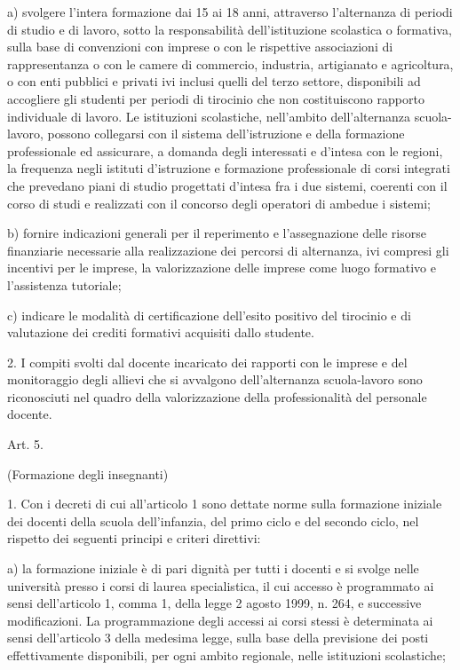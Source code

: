 a) svolgere l'intera formazione dai 15 ai 18 anni, attraverso l'alternanza di periodi di studio e di lavoro, sotto la responsabilità dell'istituzione scolastica o formativa, sulla base di convenzioni con imprese o con le rispettive associazioni di rappresentanza o con le camere di commercio, industria, artigianato e agricoltura, o con enti pubblici e privati ivi inclusi quelli del terzo settore, disponibili ad accogliere gli studenti per periodi di tirocinio che non costituiscono rapporto individuale di lavoro. Le istituzioni scolastiche, nell'ambito dell'alternanza scuola-lavoro, possono collegarsi con il sistema dell'istruzione e della formazione professionale ed assicurare, a domanda degli interessati e d'intesa con le regioni, la frequenza negli istituti d'istruzione e formazione professionale di corsi integrati che prevedano piani di studio progettati d'intesa fra i due sistemi, coerenti con il corso di studi e realizzati con il concorso degli operatori di ambedue i sistemi;

b) fornire indicazioni generali per il reperimento e l'assegnazione delle risorse finanziarie necessarie alla realizzazione dei percorsi di alternanza, ivi compresi gli incentivi per le imprese, la valorizzazione delle imprese come luogo formativo e l'assistenza tutoriale;

c) indicare le modalità di certificazione dell'esito positivo del tirocinio e di valutazione dei crediti formativi acquisiti dallo studente.

2. I compiti svolti dal docente incaricato dei rapporti con le imprese e del monitoraggio degli allievi che si avvalgono dell'alternanza scuola-lavoro sono riconosciuti nel quadro della valorizzazione della professionalità del personale docente.

Art. 5.

(Formazione degli insegnanti)

1. Con i decreti di cui all'articolo 1 sono dettate norme sulla formazione iniziale dei docenti della scuola dell'infanzia, del primo ciclo e del secondo ciclo, nel rispetto dei seguenti principi e criteri direttivi:

a) la formazione iniziale è di pari dignità per tutti i docenti e si svolge nelle università presso i corsi di laurea specialistica, il cui accesso è programmato ai sensi dell'articolo 1, comma 1, della legge 2 agosto 1999, n. 264, e successive modificazioni. La programmazione degli accessi ai corsi stessi è determinata ai sensi dell'articolo 3 della medesima legge, sulla base della previsione dei posti effettivamente disponibili, per ogni ambito regionale, nelle istituzioni scolastiche;

